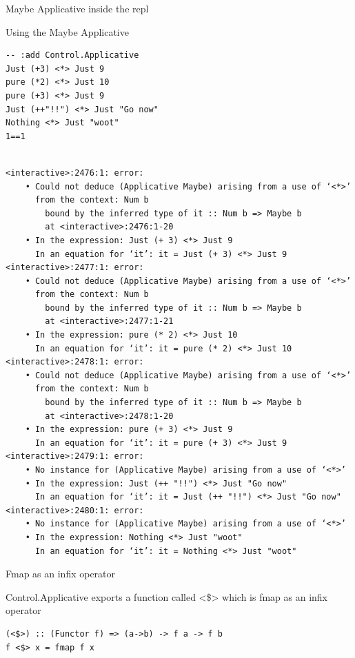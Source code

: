 \documentclass[presetation]{beamer}
\begin{document}
\begin{frame}[fragile,label={sec:org2ac5985}]{Maybe Applicative inside the repl}
 \begin{block}{Using the Maybe Applicative}
\begin{verbatim}
-- :add Control.Applicative
Just (+3) <*> Just 9
pure (*2) <*> Just 10
pure (+3) <*> Just 9
Just (++"!!") <*> Just "Go now"
Nothing <*> Just "woot"
1==1
\end{verbatim}

\begin{verbatim}

<interactive>:2476:1: error:
    • Could not deduce (Applicative Maybe) arising from a use of ‘<*>’
      from the context: Num b
        bound by the inferred type of it :: Num b => Maybe b
        at <interactive>:2476:1-20
    • In the expression: Just (+ 3) <*> Just 9
      In an equation for ‘it’: it = Just (+ 3) <*> Just 9
<interactive>:2477:1: error:
    • Could not deduce (Applicative Maybe) arising from a use of ‘<*>’
      from the context: Num b
        bound by the inferred type of it :: Num b => Maybe b
        at <interactive>:2477:1-21
    • In the expression: pure (* 2) <*> Just 10
      In an equation for ‘it’: it = pure (* 2) <*> Just 10
<interactive>:2478:1: error:
    • Could not deduce (Applicative Maybe) arising from a use of ‘<*>’
      from the context: Num b
        bound by the inferred type of it :: Num b => Maybe b
        at <interactive>:2478:1-20
    • In the expression: pure (+ 3) <*> Just 9
      In an equation for ‘it’: it = pure (+ 3) <*> Just 9
<interactive>:2479:1: error:
    • No instance for (Applicative Maybe) arising from a use of ‘<*>’
    • In the expression: Just (++ "!!") <*> Just "Go now"
      In an equation for ‘it’: it = Just (++ "!!") <*> Just "Go now"
<interactive>:2480:1: error:
    • No instance for (Applicative Maybe) arising from a use of ‘<*>’
    • In the expression: Nothing <*> Just "woot"
      In an equation for ‘it’: it = Nothing <*> Just "woot"
\end{verbatim}
\end{block}
\end{frame}


\begin{frame}[fragile,label={sec:orgcf867bf}]{Fmap as an infix operator}
 \begin{block}{Control.Applicative exports a function called <\$>}
which is fmap as an infix operator
\begin{verbatim}
(<$>) :: (Functor f) => (a->b) -> f a -> f b
f <$> x = fmap f x
\end{verbatim}
\end{block}
\end{frame}
\end{document}
